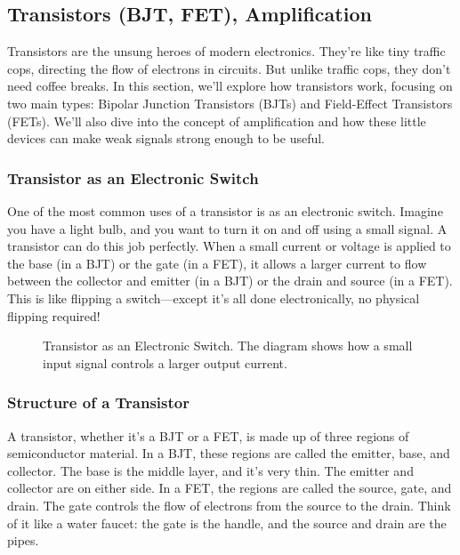 \subsection{Transistors (BJT, FET), Amplification}
\label{subsec:transistors}

Transistors are the unsung heroes of modern electronics. They’re like tiny traffic cops, directing the flow of electrons in circuits. But unlike traffic cops, they don’t need coffee breaks. In this section, we’ll explore how transistors work, focusing on two main types: Bipolar Junction Transistors (BJTs) and Field-Effect Transistors (FETs). We’ll also dive into the concept of amplification and how these little devices can make weak signals strong enough to be useful.

\subsubsection*{Transistor as an Electronic Switch}
One of the most common uses of a transistor is as an electronic switch. Imagine you have a light bulb, and you want to turn it on and off using a small signal. A transistor can do this job perfectly. When a small current or voltage is applied to the base (in a BJT) or the gate (in a FET), it allows a larger current to flow between the collector and emitter (in a BJT) or the drain and source (in a FET). This is like flipping a switch—except it’s all done electronically, no physical flipping required!

\begin{figure}[h!]
    \centering
    \caption{Transistor as an Electronic Switch. The diagram shows how a small input signal controls a larger output current.}
    \label{fig:transistor_switch}
\end{figure}

\subsubsection*{Structure of a Transistor}
A transistor, whether it’s a BJT or a FET, is made up of three regions of semiconductor material. In a BJT, these regions are called the emitter, base, and collector. The base is the middle layer, and it’s very thin. The emitter and collector are on either side. In a FET, the regions are called the source, gate, and drain. The gate controls the flow of electrons from the source to the drain. Think of it like a water faucet: the gate is the handle, and the source and drain are the pipes.

